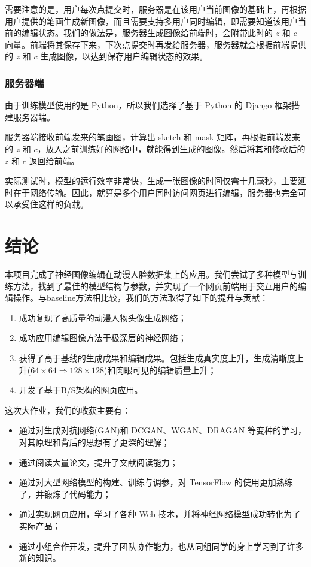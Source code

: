 \documentclass[a4paper,12pt,UTF8]{ctexart}
\begin{document}
需要注意的是，用户每次点提交时，服务器是在该用户当前图像的基础上，再根据用户提供的笔画生成新图像，而且需要支持多用户同时编辑，即需要知道该用户当前的编辑状态。我们的做法是，服务器生成图像给前端时，会附带此时的 $z$ 和 $c$ 向量。前端将其保存下来，下次点提交时再发给服务器，服务器就会根据前端提供的 $z$ 和 $c$ 生成图像，以达到保存用户编辑状态的效果。

\subsubsection{服务器端}
由于训练模型使用的是 Python，所以我们选择了基于 Python 的 Django 框架搭建服务器端。

服务器端接收前端发来的笔画图，计算出 sketch 和 mask 矩阵，再根据前端发来的 $z$ 和 $c$，放入之前训练好的网络中，就能得到生成的图像。然后将其和修改后的 $z$ 和 $c$ 返回给前端。

实际测试时，模型的运行效率非常快，生成一张图像的时间仅需十几毫秒，主要延时在于网络传输。因此，就算是多个用户同时访问网页进行编辑，服务器也完全可以承受住这样的负载。

\section{结论}

本项目完成了神经图像编辑在动漫人脸数据集上的应用。我们尝试了多种模型与训练方法，找到了最佳的模型结构与参数，并实现了一个网页前端用于交互用户的编辑操作。与baseline方法相比较，我们的方法取得了如下的提升与贡献：

\begin{enumerate}
  \item 成功复现了高质量的动漫人物头像生成网络；
  \item 成功应用编辑图像方法于极深层的神经网络；
  \item 获得了高于基线的生成成果和编辑成果。包括生成真实度上升，生成清晰度上升($64 \times 64 \Rightarrow 128 \times 128$)和肉眼可见的编辑质量上升；
  \item 开发了基于B/S架构的网页应用。
\end{enumerate}

这次大作业，我们的收获主要有：
\begin{itemize}
  \item 通过对生成对抗网络(GAN)和 DCGAN、WGAN、DRAGAN 等变种的学习，对其原理和背后的思想有了更深的理解；
  \item 通过阅读大量论文，提升了文献阅读能力；
  \item 通过对大型网络模型的构建、训练与调参，对 TensorFlow 的使用更加熟练了，并锻炼了代码能力；
  \item 通过实现网页应用，学习了各种 Web 技术，并将神经网络模型成功转化为了实际产品；
  \item 通过小组合作开发，提升了团队协作能力，也从同组同学的身上学习到了许多新的知识。
\end{itemize}

\medskip

{\small


}
\end{document}
